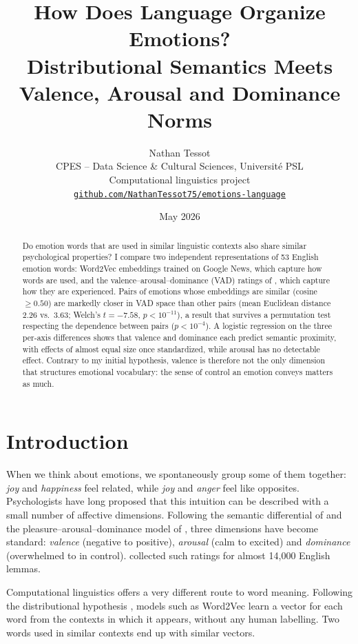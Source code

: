 \documentclass[11pt,a4paper]{article}
\title{\vspace{-1.2cm}\textbf{How Does Language Organize Emotions?}\\[4pt]
\large Distributional Semantics Meets Valence, Arousal and Dominance Norms}
\author{Nathan Tessot\\[2pt]
\small CPES -- Data Science \& Cultural Sciences, Université PSL\\
\small Computational linguistics project\\[2pt]
\small \href{https://github.com/NathanTessot75/emotions-language}{\texttt{github.com/NathanTessot75/emotions-language}}}
\date{\small May 2026}
\begin{document}
\maketitle

\begin{abstract}
\noindent
Do emotion words that are used in similar linguistic contexts also share
similar psychological properties? I compare two independent representations
of 53 English emotion words: Word2Vec embeddings trained on Google News,
which capture how words are used, and the valence--arousal--dominance (VAD)
ratings of \citet{warriner2013}, which capture how they are experienced.
Pairs of emotions whose embeddings are similar (cosine $\geq 0.50$) are
markedly closer in VAD space than other pairs (mean Euclidean distance 2.26
vs.\ 3.63; Welch's $t = -7.58$, $p < 10^{-11}$), a result that survives a
permutation test respecting the dependence between pairs ($p < 10^{-4}$).
A logistic regression on the three per-axis differences shows that valence
and dominance each predict semantic proximity, with effects of almost equal
size once standardized, while arousal has no detectable effect. Contrary
to my initial hypothesis, valence is therefore not the only dimension that
structures emotional vocabulary: the sense of control an emotion conveys
matters as much.
\end{abstract}

\section{Introduction}

When we think about emotions, we spontaneously group some of them together:
\emph{joy} and \emph{happiness} feel related, while \emph{joy} and
\emph{anger} feel like opposites. Psychologists have long proposed that this
intuition can be described with a small number of affective dimensions.
Following the semantic differential of \citet{osgood1957} and the
pleasure--arousal--dominance model of \citet{mehrabian1974}, three dimensions
have become standard: \emph{valence} (negative to positive), \emph{arousal}
(calm to excited) and \emph{dominance} (overwhelmed to in control).
\citet{warriner2013} collected such ratings for almost 14{,}000 English
lemmas.

Computational linguistics offers a very different route to word meaning.
Following the distributional hypothesis \citep{harris1954}, models such as
Word2Vec \citep{mikolov2013a,mikolov2013b} learn a vector for each word from
the contexts in which it appears, without any human labelling. Two words
used in similar contexts end up with similar vectors.
\end{document}
